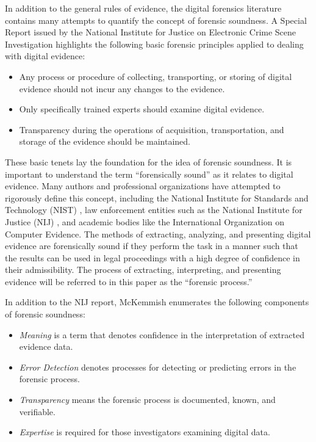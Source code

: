 In addition to the general rules of evidence, the digital forensics literature contains many attempts to quantify the concept of forensic soundness.
A Special Report issued by the National Institute for Justice on Electronic Crime Scene Investigation \cite{NIJ2008} highlights the following basic forensic 
principles applied to dealing with digital evidence:

\begin{itemize}
\item Any process or procedure of collecting, transporting, or storing of digital evidence should not incur any changes to the evidence.
\item Only specifically trained experts should examine digital evidence.
\item Transparency during the operations of acquisition, transportation, and storage of the evidence should be maintained.
\end{itemize}

These basic tenets lay the foundation for the idea of forensic soundness. It is important to understand the term “forensically sound” 
as it relates to digital evidence. Many authors and professional organizations have attempted to rigorously define this concept, 
including the National Institute for Standards and Technology (NIST) \cite{NIST2001}, law enforcement entities such as the National Institute for 
Justice (NIJ) \cite{NIJ2008}, and academic bodies like the International Organization on Computer Evidence\cite{IOCE2002}. The methods of extracting, analyzing, 
and presenting digital evidence are forensically sound if they perform the task in a manner such that the results can be used in legal 
proceedings with a high degree of confidence in their admissibility. The process of extracting, interpreting, and presenting evidence 
will be referred to in this paper as the “forensic process.”

In addition to the NIJ report, McKemmish \cite{mckemmish2008} enumerates the following components of forensic soundness:

\begin{itemize}
\item \emph{Meaning} is a term that denotes confidence in the interpretation of extracted evidence data.
\item \emph{Error Detection} denotes processes for detecting or predicting errors in the forensic process.
\item \emph{Transparency} means the forensic process is documented, known, and verifiable.
\item \emph{Expertise} is required for those investigators examining digital data.
\end{itemize}

